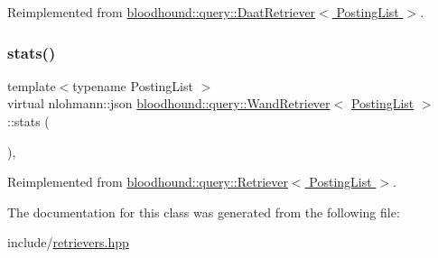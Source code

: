 Reimplemented from \hyperlink{classbloodhound_1_1query_1_1DaatRetriever_ab80b4867fc263827dc2fdbe0965a2e8c}{bloodhound\+::query\+::\+Daat\+Retriever$<$ Posting\+List $>$}.

\mbox{\label{classbloodhound_1_1query_1_1WandRetriever_a1e593c2cddb2ca4f2415c59ca26e6a36}} 
\subsubsection{\texorpdfstring{stats()}{stats()}}
{\footnotesize\ttfamily template$<$typename Posting\+List $>$ \\
virtual nlohmann\+::json \hyperlink{classbloodhound_1_1query_1_1WandRetriever}{bloodhound\+::query\+::\+Wand\+Retriever}$<$ \hyperlink{classbloodhound_1_1PostingList}{Posting\+List} $>$\+::stats (\begin{DoxyParamCaption}{ }\end{DoxyParamCaption})\hspace{0.3cm}{\ttfamily [inline]}, {\ttfamily [virtual]}}



Reimplemented from \hyperlink{classbloodhound_1_1query_1_1Retriever_a58da32a5139b980ba874f8b5e6bb89ec}{bloodhound\+::query\+::\+Retriever$<$ Posting\+List $>$}.



The documentation for this class was generated from the following file\+:\begin{DoxyCompactItemize}
\item 
include/\hyperlink{retrievers_8hpp}{retrievers.\+hpp}\end{DoxyCompactItemize}
